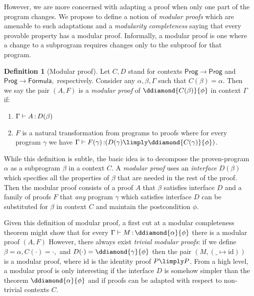 \documentclass[12pt]{cmuthesis}
\newtheorem{theorem}{Theorem}
\theoremstyle{definition}
\newtheorem{definition}{Definition}
\theoremstyle{remark}
\newcommand{\G}{\Gamma}
\begin{document}
However, we are more concerned with adapting a proof when only one part of the program changes.
We propose to define a notion of \emph{modular proofs} which are amenable to such adaptations and a \emph{modularity completeness} saying that every provable property has a modular proof.
Informally, a modular proof is one where a change to a subprogram requires changes only to the subproof for that program.
\begin{definition}[Modular proof]
Let $C,D$ stand for contexts $\mathsf{Prog} \to \mathsf{Prog}$ and $\mathsf{Prog} \to \mathsf{Formula},$ respectively.
Consider any $\alpha,\beta,\G$ such that $C(\beta) = \alpha$.
Then we say the pair $(A,F)$ is a \emph{modular proof} of $\ddiamond{C(\beta)}{\phi}$ in context $\G$ if:
\begin{enumerate}
\item $\proves{\G}{A}{D(\beta)}$
\item $F$ is a natural transformation  from programs to proofs where for every program $\gamma$ we have $\proves{\G}{F(\gamma)}{(D(\gamma) \limply \ddiamond{C(\gamma)}{\phi})}$.
\end{enumerate}
\end{definition}
While this definition is subtle, the basic idea is to decompose the proven-program $\alpha$ as a subprogram $\beta$ in a context $C$.
A \emph{modular proof} uses an \emph{interface} $D(\beta)$ which specifies all the properties of $\beta$ that are needed in the rest of the proof.
Then the modular proof consists of a proof $A$ that $\beta$ satisfies interface $D$ and a family of proofs $F$ that \emph{any} program $\gamma$ which satisfies interface $D$ can be substituted for $\beta$ in context $C$ and maintain the postcondition $\phi$.

Given this definition of modular proof, a first cut at a modular completeness theorem might show that for every $\proves{\G}{M}{\ddiamond{\alpha}{\phi}}$ there is a modular proof $(A,F)$
However, there always exist \emph{trivial modular proofs}: if we define $\beta = \alpha, C(\cdot)=\cdot,$ and $D(\cdot) = \ddiamond{\gamma}{\phi}$ then the pair $(M,(\_ \mapsto \text{id}))$ is a modular proof, where $\text{id}$ is the identity proof $P \limply P$.
From a high level, a modular proof is only interesting if the interface $D$ is somehow simpler than the theorem $\ddiamond{\alpha}{\phi}$ and if proofs can be adapted with respect to non-trivial contexts $C$.
\end{document}
